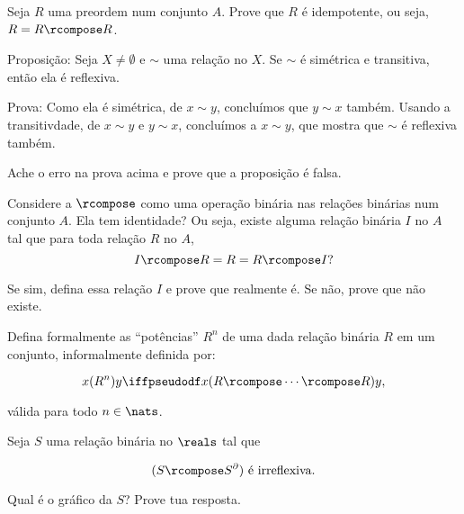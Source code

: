 \begin{exercise}
Seja $R$ uma preordem num conjunto $A$. Prove que $R$ é idempotente, ou seja, $R = R \rcompose R$.
\end{exercise}

\begin{exercise}
	Proposição: Seja $X \neq \emptyset$ e $\sim$ uma relação no $X$. Se $\sim$ é simétrica e transitiva, então ela é reflexiva.

	Prova: Como ela é simétrica, de $x \sim y$, concluímos que $y \sim x$ também. Usando a transitivdade, de $x \sim y$ e $y \sim x$, concluímos a $x \sim y$, que mostra que $\sim$ é reflexiva também.

	Ache o erro na prova acima e prove que a proposição é falsa.
\end{exercise}

\begin{exercise}
Considere a $\rcompose$ como uma operação binária nas relações binárias num conjunto $A$. Ela tem identidade? Ou seja, existe alguma relação binária $I$ no $A$ tal que para toda relação $R$ no $A$,
$$
    I \rcompose R = R = R \rcompose I \text{?}
$$

Se sim, defina essa relação $I$ e prove que realmente é. Se não, prove que não existe.
\end{exercise}

\begin{exercise}
Defina formalmente as ``potências'' $R^n$ de uma dada relação binária $R$ em um conjunto, informalmente definida por:

$$
    x(R^n)y \iffpseudodf x (R \rcompose \cdots \rcompose R) y, 
$$ 

válida para todo $n \in \nats$.
\end{exercise}

\begin{exercise}
Seja $S$ uma relação binária no $\reals$ tal que

$$
    (S \rcompose S^{\partial}) \text{ é irreflexiva}.
$$

Qual é o gráfico da $S$? Prove tua resposta.
\end{exercise}
